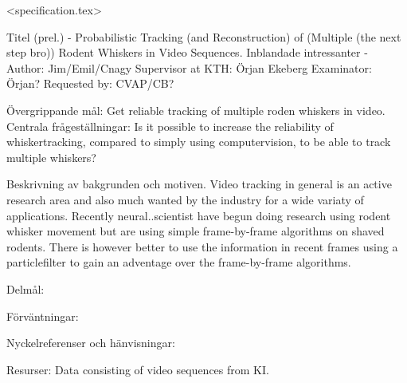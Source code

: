 
<specification.tex>

Titel (prel.) - Probabilistic Tracking (and Reconstruction) of (Multiple (the next step bro)) Rodent Whiskers in Video Sequences.
Inblandade intressanter -   Author: Jim/Emil/Cnagy
                            Supervisor at KTH: Örjan Ekeberg
                            Examinator: Örjan?
                            Requested by: CVAP/CB?

Övergrippande mål:
    Get reliable tracking of multiple roden whiskers in video.
Centrala frågeställningar:
    Is it possible to increase the reliability of whiskertracking, compared to simply using computervision, to be able to track multiple whiskers?

Beskrivning av bakgrunden och motiven.
    Video tracking in general is an active research area and also much wanted by the industry for a wide variaty of applications.
    Recently neural..scientist have begun doing research using rodent whisker movement but are using simple frame-by-frame algorithms on shaved rodents.
    There is however better to use the information in recent frames using a particlefilter to gain an adventage over the frame-by-frame algorithms.
 

Delmål:


Förväntningar:


Nyckelreferenser och hänvisningar:


Resurser:
   Data consisting of video sequences from KI.


